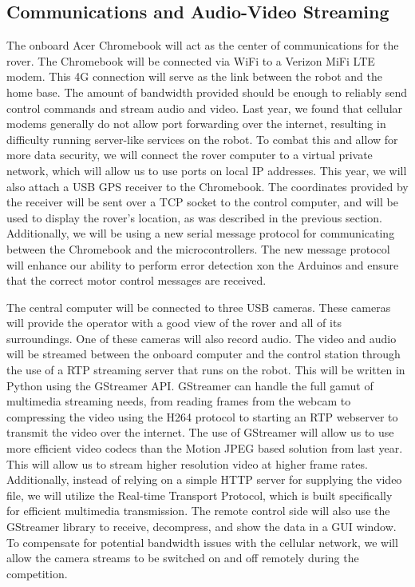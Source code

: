 \documentclass[titlepage,twocolumn,10pt]{article}
\begin{document}
    \subsection{Communications and Audio-Video Streaming}
    The onboard Acer Chromebook will act as the center of communications for the rover.  The Chromebook will be connected via WiFi to a Verizon MiFi LTE modem.  This 4G connection will serve as the link between the robot and the home base.  The amount of bandwidth provided should be enough to reliably send control commands and stream audio and video.  Last year, we found that cellular modems generally do not allow port forwarding over the internet, resulting in difficulty running server-like services on the robot.  To combat this and allow for more data security, we will connect the rover computer to a virtual private network, which will allow us to use ports on local IP addresses.  This year, we will also attach a USB GPS receiver to the Chromebook.  The coordinates provided by the receiver will be sent over a TCP socket to the control computer, and will be used to display the rover's location, as was described in the previous section.  Additionally, we will be using a new serial message protocol for communicating between the Chromebook and the microcontrollers.  The new message protocol will enhance our ability to perform error detection xon the Arduinos and ensure that the correct motor control messages are received.

    The central computer will be connected to three USB cameras.  These cameras will provide the operator with a good view of the rover and all of its surroundings.  One of these cameras will also record audio.  The video and audio will be streamed between the onboard computer and the control station through the use of a RTP streaming server that runs on the robot.  This will be written in Python using the GStreamer API.  GStreamer can handle the full gamut of multimedia streaming needs, from reading frames from the webcam to compressing the video using the H264 protocol to starting an RTP webserver to transmit the video over the internet.  The use of GStreamer will allow us to use more efficient video codecs than the Motion JPEG based solution from last year.  This will allow us to stream higher resolution video at higher frame rates.  Additionally, instead of relying on a simple HTTP server for supplying the video file, we will utilize the Real-time Transport Protocol, which is built specifically for efficient multimedia transmission.  The remote control side will also use the GStreamer library to receive, decompress, and show the data in a GUI window.  To compensate for potential bandwidth issues with the cellular network, we will allow the camera streams to be switched on and off remotely during the competition.
\end{document}
